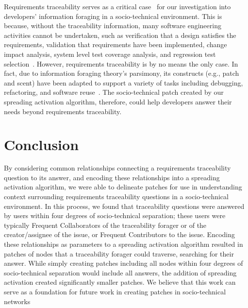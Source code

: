Requirements traceability serves as a critical case~\cite{yin03} for our investigation into developers' information foraging in a socio-technical environment. This is because, without the traceability information, many software engineering activities cannot be undertaken, such as verification that a design satisfies the requirements, validation that requirements have been implemented, change impact analysis, system level test coverage analysis, and regression test selection~\cite{Hayes-TSE06}. However, requirements traceability is by no means the only case. In fact, due to information foraging theory's parsimony, its constructs (e.g., patch and scent) have been adapted to support a variety of tasks including debugging, refactoring, and software reuse~\cite{Fleming-TOSEM13, Ragavan-CHI16, Ragavan-CHI17}. The socio-technical patch created by our spreading activation algorithm, therefore, could help developers answer their needs beyond requirements traceability.

\section{Conclusion}
By considering common relationships connecting a requirements traceability question to its answer, and encoding these relationships into a spreading activation algorithm, we were able to delineate patches for use in understanding context surrounding requirements traceability questions in a socio-technical environment. In this process, we found that traceability questions were answered by users within four degrees of socio-technical separation; these users were typically Frequent Collaborators of the traceability forager or of the creator/assignee of the issue, or Frequent Contributors to the issue. Encoding these relationships as parameters to a spreading activation algorithm resulted in patches of nodes that a traceability forager could traverse, searching for their answer. While simply creating patches including all nodes within four degrees of socio-technical separation would include all answers, the addition of spreading activation created significantly smaller patches. We believe that this work can serve as a foundation for future work in creating patches in socio-technical networks